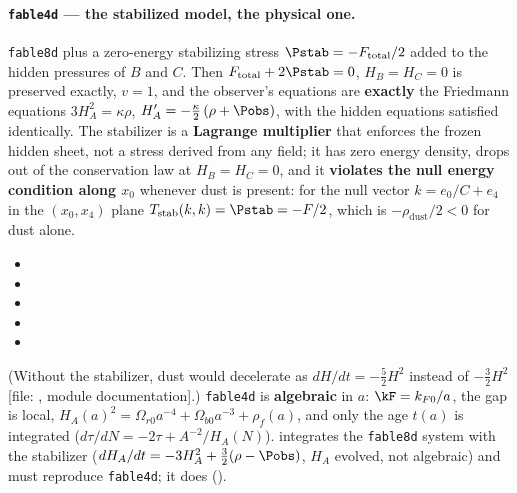 \paragraph{\texttt{fable4d} --- the stabilized model, the physical one.} \texttt{fable8d} plus a
zero-energy stabilizing stress $\Pstab=-F_{\mathrm{total}}/2$ added to the hidden pressures of $B$ and $C$.
Then $F_{\mathrm{total}}+2\Pstab=0$, $H_B=H_C=0$ is preserved exactly, $v=1$, and the observer's equations
are \textbf{exactly} the Friedmann equations $3H_A^2=\kappa\rho$, $H_A'=-\frac\kappa2\,(\rho+\Pobs)$, with the
hidden equations satisfied identically. The stabilizer is a \textbf{Lagrange multiplier} that enforces the
frozen hidden sheet, not a stress derived from any field; it has zero energy density, drops out of the
conservation law at $H_B=H_C=0$, and it \textbf{violates the null energy condition along $x_0$} whenever
dust is present: for the null vector $k=e_0/C+e_4$ in the $(x_0,x_4)$ plane $T_{\mathrm{stab}}(k,k)=\Pstab=-F/2$,
which is $-\rho_{\mathrm{dust}}/2<0$ for dust alone. 
\begin{itemize}
  \item {}
  \item {}
  \item {}
  \item {}
  \item {}
\end{itemize}
(Without the stabilizer, dust would decelerate as $dH/dt=-\tfrac52H^2$ instead of $-\tfrac32H^2$ [file:
, module documentation].) \texttt{fable4d} is \textbf{algebraic} in $a$: $\kF=k_{F0}/a$, the
gap is local, $H_A(a)^2=\Omega_{r0}a^{-4}+\Omega_{b0}a^{-3}+\rho_f(a)$, and only the age $t(a)$ is integrated
($d\tau/dN=-2\tau+A^{-2}/H_A(N)$).  integrates the \texttt{fable8d} system with
the stabilizer ($dH_A/dt=-3H_A^2+\tfrac32(\rho-\Pobs)$, $H_A$ evolved, not algebraic) and must reproduce
\texttt{fable4d}; it does ().

